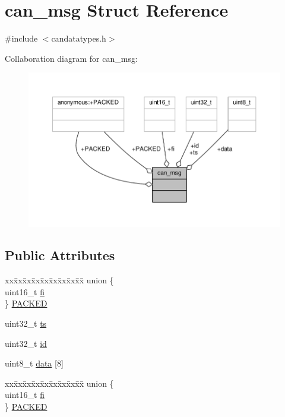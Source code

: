 \hypertarget{structcan__msg}{}\section{can\+\_\+msg Struct Reference}
\label{structcan__msg}


{\ttfamily \#include $<$candatatypes.\+h$>$}



Collaboration diagram for can\+\_\+msg\+:\nopagebreak
\begin{figure}[H]
\begin{center}
\leavevmode
\includegraphics[width=350pt]{structcan__msg__coll__graph}
\end{center}
\end{figure}
\subsection*{Public Attributes}
\begin{DoxyCompactItemize}
\item 
\begin{tabbing}
xx\=xx\=xx\=xx\=xx\=xx\=xx\=xx\=xx\=\kill
union \{\\
\>uint16\_t \hyperlink{structcan__msg_ad1e9cccb168fbc295bb79ef7d9c5c915}{fi}\\
\} \hyperlink{structcan__msg_a233f7f010cc90ec3d453bcb75d66c14e}{PACKED}\\

\end{tabbing}\item 
uint32\+\_\+t \hyperlink{structcan__msg_a157aaad2daf039f59606522c6a51663a}{ts}
\item 
uint32\+\_\+t \hyperlink{structcan__msg_a9a5f820883d3dfe1f0c6bc33c3f95989}{id}
\item 
uint8\+\_\+t \hyperlink{structcan__msg_ac0dab268ebadaa9521b4d535c03f13d8}{data} \mbox{[}8\mbox{]}
\item 
\begin{tabbing}
xx\=xx\=xx\=xx\=xx\=xx\=xx\=xx\=xx\=\kill
union \{\\
\>uint16\_t \hyperlink{structcan__msg_ad1e9cccb168fbc295bb79ef7d9c5c915}{fi}\\
\} \hyperlink{structcan__msg_a11a48cac095afd9250fe22fa37929aec}{PACKED}\\

\end{tabbing}\end{DoxyCompactItemize}


